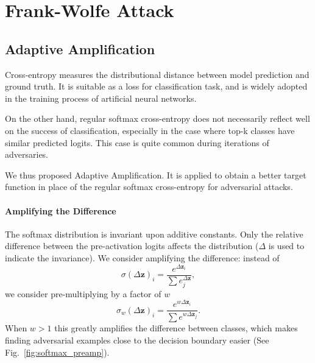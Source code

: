 \documentclass{article}
\begin{document}
\section{Frank-Wolfe Attack}\label{sec:AttackMethodology}
    \subsection{Adaptive Amplification}
        Cross-entropy measures the distributional distance between model prediction and ground truth. It is suitable as a loss for classification task, and is widely adopted in the training process of artificial neural networks.

        On the other hand, regular softmax cross-entropy does not necessarily reflect well on the success of classification, especially in the case where top-k classes have similar predicted logits. This case is quite common during iterations of adversaries.

        We thus proposed Adaptive Amplification. It is applied to obtain a better target function in place of the regular softmax cross-entropy for adversarial attacks.

        \paragraph{Amplifying the Difference} The softmax distribution is invariant upon additive constants. Only the relative difference between the pre-activation logits affects the distribution ($\Delta$ is used to indicate the invariance). We consider amplifying the difference: instead of
        \newcommand{\vdz}{\Delta \mathbf{z}}
        \begin{equation}
            \sigma(\vdz)_i = \frac{e^{\vdz_i}}{\sum e^{\vdz}_j},
        \end{equation}
        we consider pre-multiplying by a factor of $w$
        \begin{equation}
            \sigma_w(\vdz)_i = \frac{e^{w\vdz_i}}{\sum e^{w\vdz_j}}.
        \end{equation}
        When $w > 1$ this greatly amplifies the difference between classes, which makes finding adversarial examples close to the decision boundary easier (See Fig.\ \ref{fig:softmax_preamp}).
\end{document}
